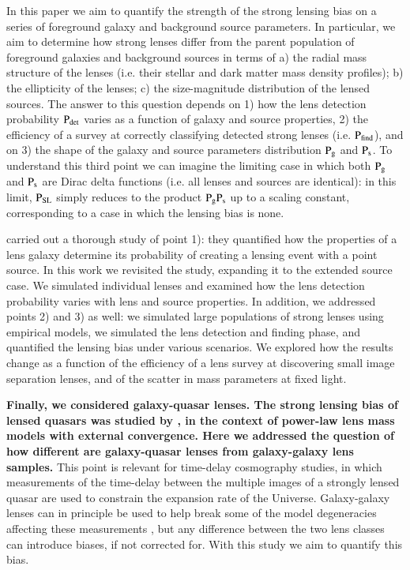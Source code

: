 \documentclass{aa}
\def\prlens{{\rm P}_\mathrm{g}}
\def\prsource{{\rm P}_\mathrm{s}}
\def\prsl{{\rm P}_\mathrm{{SL}}}
\def\pdet{{\rm P}_\mathrm{det}}
\def\pfind{{\rm P}_\mathrm{find}}
\begin{document}
In this paper we aim to quantify the strength of the strong lensing bias on a series of foreground galaxy and background source parameters. 
In particular, we aim to determine how strong lenses differ from the parent population of foreground galaxies and background sources in terms of a) the radial mass structure of the lenses (i.e. their stellar and dark matter mass density profiles); b) the ellipticity of the lenses; c) the size-magnitude distribution of the lensed sources.
The answer to this question depends on 1) how the lens detection probability $\pdet$ varies as a function of galaxy and source properties, 2) the efficiency of a survey at correctly classifying detected strong lenses (i.e. $\pfind$), and on 3) the shape of the galaxy and source parameters distribution $\prlens$ and $\prsource$. To understand this third point we can imagine the limiting case in which both $\prlens$ and $\prsource$ are Dirac delta functions (i.e. all lenses and sources are identical): in this limit, $\prsl$ simply reduces to the product $\prlens\prsource$ up to a scaling constant, corresponding to a case in which the lensing bias is none.

\citet{MVK09} carried out a thorough study of point 1): they quantified how the properties of a lens galaxy determine its probability of creating a lensing event with a point source.
In this work we revisited the \citet{MVK09} study, expanding it to the extended source case. We simulated individual lenses and examined how the lens detection probability varies with lens and source properties.
In addition, we addressed points 2) and 3) as well: we simulated large populations of strong lenses using empirical models, we simulated the lens detection and finding phase, and quantified the lensing bias under various scenarios.
We explored how the results change as a function of the efficiency of a lens survey at discovering small image separation lenses, and of the scatter in mass parameters at fixed light.

{\bf Finally, we considered galaxy-quasar lenses. 
The strong lensing bias of lensed quasars was studied by \citep{C+C16}, in the context of power-law lens mass models with external convergence.
Here we addressed the question of how different are galaxy-quasar lenses from galaxy-galaxy lens samples. 
}
This %
point is relevant for time-delay cosmography studies, in which measurements of the time-delay between the multiple images of a strongly lensed quasar are used to constrain the expansion rate of the Universe. Galaxy-galaxy lenses can in principle be used to help break some of the model degeneracies affecting these measurements \citep{Bir++20,B+T21}, but any difference between the two lens classes can introduce biases, if not corrected for.
With this study we aim to quantify this bias.
\end{document}
